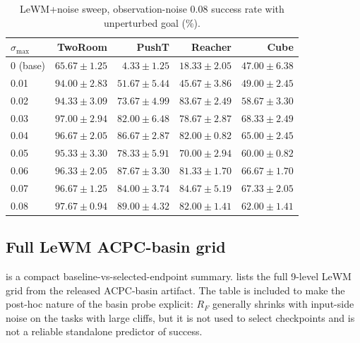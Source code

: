 \documentclass[10pt]{article}
\newcommand{\stdmax}{\ensuremath{\sigma_{\max}}}
\begin{document}
\begin{table}[H]
\centering
\caption{LeWM+noise sweep, observation-noise 0.08 success rate with unperturbed goal (\%).}
\label{tab:sweep-px08}
\small
\begin{tabular}{lrrrr}
\toprule
\stdmax{} & TwoRoom & PushT & Reacher & Cube \\
\midrule
0 (base) & $65.67 \pm 1.25$ & $\phantom{0}4.33 \pm 1.25$ & $18.33 \pm 2.05$ & $47.00 \pm 6.38$ \\
0.01 & $94.00 \pm 2.83$ & $51.67 \pm 5.44$ & $45.67 \pm 3.86$ & $49.00 \pm 2.45$ \\
0.02 & $94.33 \pm 3.09$ & $73.67 \pm 4.99$ & $83.67 \pm 2.49$ & $58.67 \pm 3.30$ \\
0.03 & $97.00 \pm 2.94$ & $82.00 \pm 6.48$ & $78.67 \pm 2.87$ & $68.33 \pm 2.49$ \\
0.04 & $96.67 \pm 2.05$ & $86.67 \pm 2.87$ & $82.00 \pm 0.82$ & $65.00 \pm 2.45$ \\
0.05 & $95.33 \pm 3.30$ & $78.33 \pm 5.91$ & $70.00 \pm 2.94$ & $60.00 \pm 0.82$ \\
0.06 & $96.33 \pm 2.05$ & $87.67 \pm 3.30$ & $81.33 \pm 1.70$ & $66.67 \pm 1.70$ \\
0.07 & $96.67 \pm 1.25$ & $84.00 \pm 3.74$ & $84.67 \pm 5.19$ & $67.33 \pm 2.05$ \\
0.08 & $97.67 \pm 0.94$ & $89.00 \pm 4.32$ & $82.00 \pm 1.41$ & $62.00 \pm 1.41$ \\
\bottomrule
\end{tabular}
\end{table}

\subsection{Full LeWM ACPC-basin grid}\label{sec:appendix-acpc-basin-grid}
 is a compact baseline-vs-selected-endpoint summary.  lists the full 9-level LeWM grid from the released ACPC-basin artifact. The table is included to make the post-hoc nature of the basin probe explicit: $R_F$ generally shrinks with input-side noise on the tasks with large cliffs, but it is not used to select checkpoints and is not a reliable standalone predictor of success.
\end{document}
